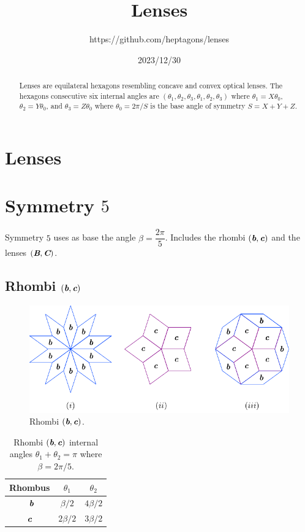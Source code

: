 \documentclass[11pt]{article}
\title{Lenses}
\author{https://github.com/heptagons/lenses}
\date{2023/12/30}
\def\mathbi#1{\textbf{\em #1}}
\begin{document}
\maketitle
\begin{abstract}
Lenses are equilateral hexagons resembling concave and convex optical lenses. The hexagons consecutive six internal angles are $(\theta_1,\theta_2,\theta_3,\theta_1,\theta_2,\theta_3)$ where $\theta_1=X\theta_0$, $\theta_2=Y\theta_0$, and $\theta_3=Z\theta_0$ where $\theta_0 = 2\pi/S$ is the base angle of symmetry $S = X + Y + Z$.
\end{abstract}

\section{Lenses}

\section{Symmetry $5$}

Symmetry $5$ uses as base the angle $\beta = \dfrac{2\pi}5$. Includes the rhombi $(\mathbi{b},\mathbi{c})$ and the lenses $(\mathbi{B},\mathbi{C})$.


\subsection{Rhombi $(\mathbi{b},\mathbi{c})$}

\begin{figure}[H]
\centering
\includegraphics[scale=1.1]{bc/rhombi}
\caption{Rhombi $(\mathbi{b},\mathbi{c})$.}
\label{fig:bc-rhombi}
\end{figure}

\begin{table}[H]
\begin{center}
\begin{tabular}{|c|c c|}
\hline
Rhombus & $\theta_1$ & $\theta_2$ \\ %
\hline\
$\mathbi{b}$ & $\beta/2$ & $4\beta/2$ \\[0.5ex] \hline
$\mathbi{c}$ & $2\beta/2$ & $3\beta/2$ \\[0.5ex] \hline
\end{tabular}
\caption{Rhombi $(\mathbi{b},\mathbi{c})$ internal angles $\theta_1 + \theta_2 = \pi$ where $\beta = 2\pi/5$.} 
\label{tbl:bc-angles}
\end{center}
\end{table}
\end{document}
